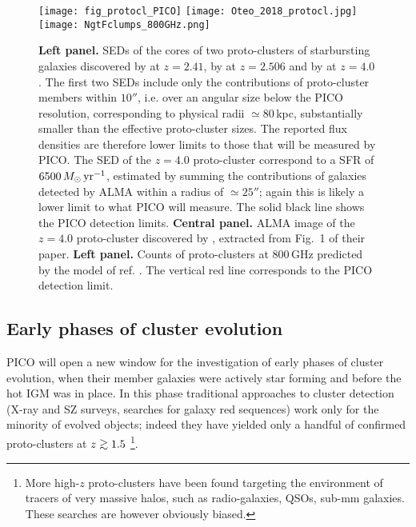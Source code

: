 \documentclass[11pt,a4paper]{article}
\def\simgt{\mathrel{\rlap{\lower 3pt\hbox{$\sim$}} \raise2.0pt\hbox{$>$}}}
\begin{document}
\begin{figure*}
\begin{center}
\texttt{[image: fig\_protocl\_PICO]}
\texttt{[image: Oteo\_2018\_protocl.jpg]}
\texttt{[image: NgtFclumps\_800GHz.png]}
\caption{\textbf{Left panel.} SEDs of the cores of two proto-clusters of starbursting galaxies
discovered by \cite{Ivison2013} at $z=2.41$, by \cite{Wang2016} at $z=2.506$ and by \cite{Oteo2018}
at $z=4.0$. The first two SEDs include only the contributions of proto-cluster members within $10''$,
i.e. over an angular size below the PICO resolution, corresponding to physical radii $\simeq 80\,$kpc,
substantially smaller than the effective proto-cluster sizes. The reported flux densities are therefore
lower limits to those that will be measured by PICO. The SED of the $z=4.0$ proto-cluster correspond to
a SFR of $6500\,M_\odot\,\hbox{yr}^{-1}$, estimated by \cite{Oteo2018} summing the contributions of
galaxies detected by ALMA within a radius of $\simeq 25''$; again this is likely a lower limit to what
PICO will measure. The solid black line shows the PICO detection limits.
\textbf{Central panel.} ALMA image of the $z=4.0$ proto-cluster discovered by \cite{Oteo2018}, extracted from Fig.~1 of their paper.
\textbf{Left panel.} Counts of proto-clusters at 800\,GHz predicted by the  model of ref. \cite{Negrello2017protocl}.
The vertical red line corresponds to the PICO detection limit.
}
\label{fig:protocluster}
\end{center}
\end{figure*}


\subsection{Early phases of cluster evolution}

PICO will open a new window for the investigation of early phases of cluster
evolution,  when their member galaxies were actively star forming and before
the hot IGM was in place. In this phase traditional approaches to cluster
detection (X-ray and SZ surveys, searches for galaxy red sequences) work only
for the minority of evolved objects; indeed they have yielded only a handful of
confirmed proto-clusters at $z\simgt 1.5$ \cite{Overzier2016}\footnote{More
high-$z$ proto-clusters have been found targeting the environment of tracers of
very massive halos, such as radio-galaxies, QSOs, sub-mm galaxies. These
searches are however obviously biased.}.
\end{document}
